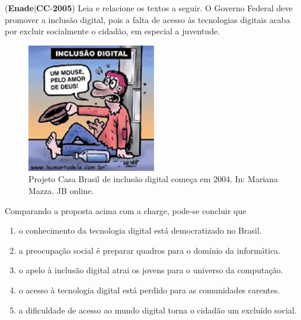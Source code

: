 \documentclass{exam}
\begin{document}
\begin{questions}
\question (\textbf{Enade}$|$\textbf{CC}-\textbf{2005}) Leia e relacione os textos a seguir.
O Governo Federal deve
promover a inclusão digital, pois
a falta de acesso às tecnologias
digitais acaba por excluir
socialmente o cidadão, em
especial a juventude.
\begin{figure}[H]
	\begin{center}
		\includegraphics[width=0.5\textwidth]{CIENCIA_DA_COMPUTACAO_Prova2005-utf8_figuras/fig-0001.jpg}
		\caption{Projeto Casa Brasil de inclusão digital começa em 2004. In: Mariana Mazza. JB online.}
	\end{center}
\end{figure}
Comparando a proposta acima com a charge, pode-se concluir que
	\begin{enumerate}[label=\alph*)]
		\item  o conhecimento da tecnologia digital está democratizado no
Brasil.
		\item  a preocupação social é preparar quadros para o domínio da
informática.
		\item  o apelo à inclusão digital atrai os jovens para o universo da
computação.
		\item  o acesso à tecnologia digital está perdido para as comunidades
carentes.
		\item  a dificuldade de acesso ao mundo digital torna o cidadão um
excluído social.

	\end{enumerate}


\end{questions}
\end{document}
